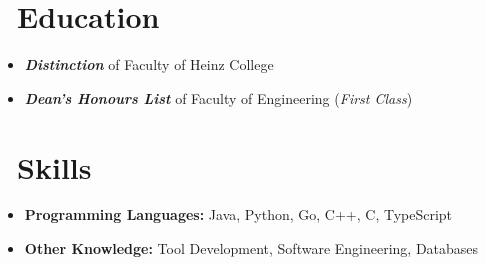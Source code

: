 \documentclass{resume}
\begin{document}



\section{\faGraduationCap\ Education}
\begin{itemize}[parsep=0.5ex]
  \item \textbf{\textit{Distinction}} of Faculty of Heinz College
\end{itemize}
\begin{itemize}[parsep=0.5ex]
  \item \textbf{\textit{Dean's Honours List}} of Faculty of Engineering (\textit{First Class})
\end{itemize}

\section{\faCogs\ Skills}
\begin{itemize}[parsep=0.5ex]
  \item \textbf{Programming Languages:} Java, Python, Go, C++, C, TypeScript
  \item \textbf{Other Knowledge:} Tool Development, Software Engineering, Databases
\end{itemize}
\end{document}
